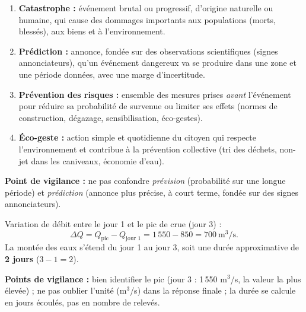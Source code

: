 \documentclass[11pt]{article}
\begin{document}
\begin{corrige}
\begin{enumerate}
\item \textbf{Catastrophe :} événement brutal ou progressif, d'origine naturelle ou humaine, qui cause des dommages importants aux populations (morts, blessés), aux biens et à l'environnement.
\item \textbf{Prédiction :} annonce, fondée sur des observations scientifiques (signes annonciateurs), qu'un événement dangereux va se produire dans une zone et une période données, avec une marge d'incertitude.
\item \textbf{Prévention des risques :} ensemble des mesures prises \emph{avant} l'événement pour réduire sa probabilité de survenue ou limiter ses effets (normes de construction, dégazage, sensibilisation, éco-gestes).
\item \textbf{Éco-geste :} action simple et quotidienne du citoyen qui respecte l'environnement et contribue à la prévention collective (tri des déchets, non-jet dans les caniveaux, économie d'eau).
\end{enumerate}
\textbf{Point de vigilance :} ne pas confondre \emph{prévision} (probabilité sur une longue période) et \emph{prédiction} (annonce plus précise, à court terme, fondée sur des signes annonciateurs).
\end{corrige}

\begin{corrige}
Variation de débit entre le jour 1 et le pic de crue (jour 3) :
\[ \Delta Q = Q_{\text{pic}} - Q_{\text{jour 1}} = 1\,550 - 850 = 700 \ \text{m}^3/\text{s}. \]
La montée des eaux s'étend du jour 1 au jour 3, soit une durée approximative de \textbf{2 jours} ($3 - 1 = 2$).

\textbf{Points de vigilance :} bien identifier le pic (jour 3 : 1\,550 m$^3$/s, la valeur la plus élevée) ; ne pas oublier l'unité (m$^3$/s) dans la réponse finale ; la durée se calcule en jours écoulés, pas en nombre de relevés.
\end{corrige}
\end{document}
